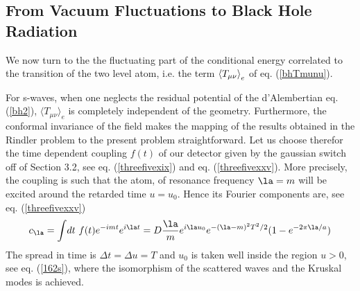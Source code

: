\subsection{From Vacuum Fluctuations to Black Hole Radiation}\label{vacfl}

We now turn to
the
the fluctuating part of the conditional energy correlated to the
transition of the two level atom, i.e. the term $\mbox{$ \langle T_{\mu\nu} \rangle $}_{e}$ of eq.
 (\ref{bhTmunu}).

For s-waves, when one neglects
the residual potential of the
d'Alembertian  eq. (\ref{bh2}), $\langle
T_{\mu\nu}\rangle_e$ is completely independent of
the geometry.
Furthermore, the conformal invariance of the field makes
the mapping of the results obtained in the Rindler problem to the
present problem
straightforward.
Let us choose therefor the time dependent coupling $f(t)$ of our detector
given by the gaussian switch off of Section 3.2, see eq. (\ref{threefivexix})
and eq. (\ref{threefivexxv}). More precisely,
the coupling is
such that the atom, of resonance frequency $\la = m$ will be excited
around the retarded time
$u=u_0$.
Hence its
Fourier
components
are, see  eq. (\ref{threefivexxv})
\begin{equation}
 c_\la =
\int \!dt\ f(t) e^{-imt}e^{i\la t} =
D { \la \over m} e^{i \la u_0}e^{-(\la - m )^2 T^2 /2}
 (1 -
e^{-2\pi \la /a})
\end{equation}
The spread in time is $\Delta t = \Delta u = T$
 and $u_0$ is taken well inside
the region $u>0$, see eq. (\ref{162s}),
 where the isomorphism of the scattered waves and the
Kruskal modes is achieved.

